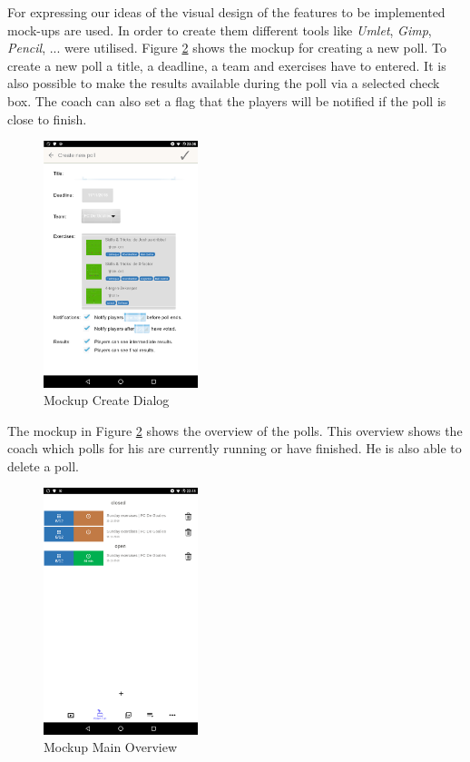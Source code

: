 For expressing our ideas of the visual design of the features to be implemented mock-ups are used. In order to create them different tools like \textit{Umlet}, \textit{Gimp}, \textit{Pencil}, ... were utilised.
\newline
Figure \ref{fig:mockup_main} shows the mockup for creating a new poll. To create a new poll a title, a deadline, a team and exercises have to entered. It is also possible to make the results available during the poll via a selected check box. The coach can also set a flag that the players will be notified if the poll is close to finish.  
\begin{figure}[H]
    \begin{center}
        \includegraphics[width=0.4\textwidth]{images/mockups/create.png}
        \caption{Mockup Create Dialog}
        \label{fig:mockup_create}
    \end{center}
\end{figure}

The mockup in Figure \ref{fig:mockup_main} shows the overview of the polls. This overview shows the coach which polls for his are currently running or have finished. He is also able to delete a poll. 
\begin{figure}[H]
    \begin{center}
        \includegraphics[width=0.4\textwidth]{images/mockups/main-active.png}
        \caption{Mockup Main Overview}
        \label{fig:mockup_main}
    \end{center}
\end{figure}

